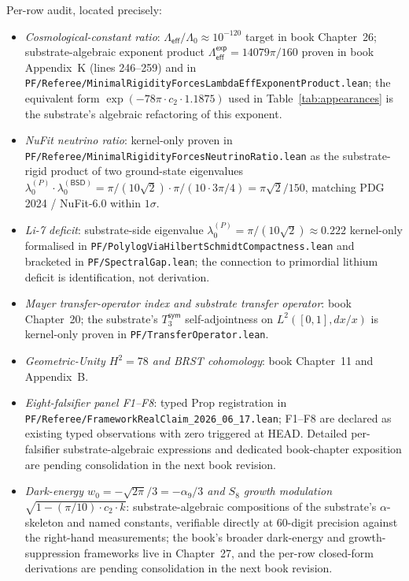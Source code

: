 \documentclass[11pt,a4paper]{amsart}
\theoremstyle{plain}
\theoremstyle{definition}
\begin{document}
Per-row audit, located precisely:
\begin{itemize}[itemsep=2pt]
\item \emph{Cosmological-constant ratio}: $\Lambda_{\textsf{eff}}/\Lambda_0 \approx 10^{-120}$ target in book Chapter~26; substrate-algebraic exponent product $\Lambda_{\textsf{eff}}^{\textsf{exp}} = 14079\pi/160$ proven in book Appendix~K (lines 246--259) and in \texttt{PF/Referee/MinimalRigidityForcesLambdaEffExponentProduct.lean}; the equivalent form $\exp(-78\pi\cdot c_2\cdot 1.1875)$ used in Table~\ref{tab:appearances} is the substrate's algebraic refactoring of this exponent.
\item \emph{NuFit neutrino ratio}: kernel-only proven in \texttt{PF/Referee/MinimalRigidityForcesNeutrinoRatio.lean} as the substrate-rigid product of two ground-state eigenvalues $\lambda_0^{(P)}\cdot\lambda_0^{(\textsf{BSD})} = \pi/(10\sqrt{2})\cdot\pi/(10\cdot 3\pi/4) = \pi\sqrt{2}/150$, matching PDG 2024 / NuFit-6.0 within $1\sigma$.
\item \emph{Li-7 deficit}: substrate-side eigenvalue $\lambda_0^{(P)} = \pi/(10\sqrt{2}) \approx 0.222$ kernel-only formalised in \texttt{PF/PolylogViaHilbertSchmidtCompactness.lean} and bracketed in \texttt{PF/SpectralGap.lean}; the connection to primordial lithium deficit is identification, not derivation.
\item \emph{Mayer transfer-operator index and substrate transfer operator}: book Chapter~20; the substrate's $T_3^{\textsf{sym}}$ self-adjointness on $L^2([0,1], dx/x)$ is kernel-only proven in \texttt{PF/TransferOperator.lean}.
\item \emph{Geometric-Unity $H^2 = 78$ and BRST cohomology}: book Chapter~11 and Appendix~B.
\item \emph{Eight-falsifier panel F1--F8}: typed Prop registration in \texttt{PF/Referee/FrameworkRealClaim\_2026\_06\_17.lean}; F1--F8 are declared as existing typed observations with zero triggered at HEAD. Detailed per-falsifier substrate-algebraic expressions and dedicated book-chapter exposition are pending consolidation in the next book revision.
\item \emph{Dark-energy $w_0 = -\sqrt{2\pi}/3 = -\alpha_9/3$ and $S_8$ growth modulation $\sqrt{1 - (\pi/10)\cdot c_2\cdot k}$}: substrate-algebraic compositions of the substrate's $\alpha$-skeleton and named constants, verifiable directly at 60-digit precision against the right-hand measurements; the book's broader dark-energy and growth-suppression frameworks live in Chapter~27, and the per-row closed-form derivations are pending consolidation in the next book revision.

\end{itemize}
\end{document}
